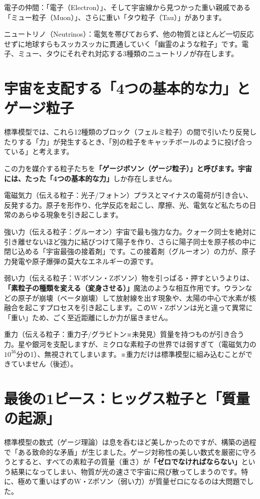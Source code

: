 電子の仲間：「電子（Electron）」、そして宇宙線から見つかった重い親戚である「ミュー粒子（Muon）」、さらに重い「タウ粒子（Tau）」があります。

ニュートリノ（Neutrinos）：電気を帯びておらず、他の物質とほとんど一切反応せずに地球すらもスッカスッカに貫通していく「幽霊のような粒子」です。電子、ミュー、タウにそれぞれ対応する3種類のニュートリノが存在します。

\section{宇宙を支配する「4つの基本的な力」とゲージ粒子}

標準模型では、これら12種類のブロック（フェルミ粒子）の間で引いたり反発したりする「力」が発生するとき、「別の粒子をキャッチボールのように投げ合っている」と考えます。

この力を媒介する粒子たちを\textbf{「ゲージボソン（ゲージ粒子）」と呼びます。宇宙には、たった「4つの基本的な力」}しか存在しません。

電磁気力（伝える粒子：光子/フォトン）プラスとマイナスの電荷が引き合い、反発する力。原子を形作り、化学反応を起こし、摩擦、光、電気など私たちの日常のあらゆる現象を引き起こします。

強い力（伝える粒子：グルーオン）宇宙で最も強力な力。クォーク同士を絶対に引き離せないほど強力に結びつけて陽子を作り、さらに陽子同士を原子核の中に閉じ込める「宇宙最強の接着剤」です。この接着剤（グルーオン）の力が、原子力発電や原子爆弾の莫大なエネルギーの源です。

弱い力（伝える粒子：Wボソン・Zボソン）物を引っぱる・押すというよりは、\textbf{「素粒子の種類を変える（変身させる）」}魔法のような相互作用です。ウランなどの原子が崩壊（ベータ崩壊）して放射線を出す現象や、太陽の中心で水素が核融合を起こすプロセスを引き起こします。このW・Zボソンは光と違って異常に「重い」ため、ごく至近距離にしか力が届きません。

重力（伝える粒子：重力子/グラビトン※未発見）質量を持つものが引き合う力。星や銀河を支配しますが、ミクロな素粒子の世界では弱すぎて（電磁気力の\(10^{36}\)分の1）、無視されてしまいます。※重力だけは標準模型に組み込むことができていません（後述）。

\section{最後の1ピース：ヒッグス粒子と「質量の起源」}

標準模型の数式（ゲージ理論）は息を呑むほど美しかったのですが、構築の過程で「ある致命的な矛盾」が生じました。ゲージ対称性の美しい数式を厳密に守ろうとすると、すべての素粒子の質量（重さ）が\textbf{「ゼロでなければならない」}という結果になってしまい、物質が光の速さで宇宙に飛び散ってしまうのです。特に、極めて重いはずのW・Zボソン（弱い力）が質量ゼロになるのは大問題でした。

